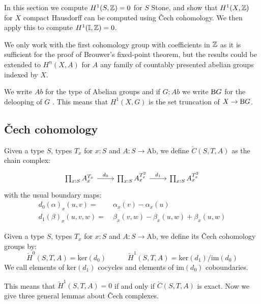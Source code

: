 In this section we compute $H^1(S,\mathbb{Z}) = 0$ for $S$ Stone, and show that $H^1(X,\mathbb{Z})$ for $X$ compact Hausdorff can be computed using \v{C}ech cohomology. We then apply this to compute $H^1(\mathbb{I},\mathbb{Z})=0$. 

\begin{remark}
We only work with the first cohomology group with coefficients in $\mathbb{Z}$ as it is sufficient for the proof of Brouwer's fixed-point theorem, but the results could be extended to $H^n(X,A)$ for $A$ any family of countably presented abelian groups indexed by $X$.
\end{remark}

\begin{remark}
We write $Ab$ for the type of Abelian groups and if $G:Ab$ we write $\mathrm{B} G$ for the delooping of $G$ \cite{hott,davidw23}. This means that $H^1(X,G)$ is the set truncation of $X \to \mathrm{B} G$. 
\end{remark}

\subsection{\v{C}ech cohomology}

\begin{definition}
Given a type $S$, types $T_x$ for $x:S$ and $A:S\to\mathrm{Ab}$, we define $\check{C}(S,T,A)$ as the chain complex:
\[
\begin{tikzcd}
     \prod_{x:S}A_x^{T_x} \ar[r,"d_0"] & \prod_{x:S}A_x^{T_x^2}\ar[r,"d_1"] &  \prod_{x:S}A_x^{T_x^3}
\end{tikzcd}
\]
with the usual boundary maps:
\begin{align*}
d_0(\alpha)_x(u,v) =&\ \alpha_x(v)-\alpha_x(u)\\
d_1(\beta)_x(u,v,w) =&\ \beta_x(v,w) - \beta_x(u,w) + \beta_x(u,w)
\end{align*}
\end{definition}

\begin{definition}
Given a type $S$, types $T_x$ for $x:S$ and $A:S\to\mathrm{Ab}$, we define its \v{C}ech cohomology groups by:
\[
  \check{H}^0(S,T,A) = \mathrm{ker}(d_0)\quad \quad \quad \check{H}^1(S,T,A) = \mathrm{ker}(d_1)/\mathrm{im}(d_0)
\]
We call elements of $\mathrm{ker}(d_1)$ cocycles and elements of $\mathrm{im}(d_0)$ coboundaries.
\end{definition}

This means that $\check{H}^1(S,T,A) = 0$ if and only if $\check{C}(S,T,A)$ is exact. Now we give three general lemmas about \v{C}ech complexes.

